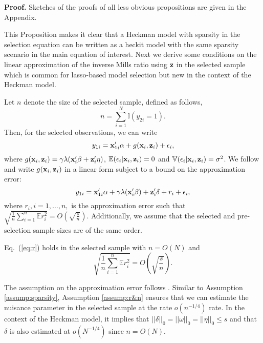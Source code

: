 \documentclass[11pt]{article}
\begin{document}
\textbf{Proof.} Sketches of the proofs of all less obvious propositions are given in the Appendix. 

This Proposition makes it clear that a Heckman model with sparsity in the selection equation can be written as a heckit model with the same sparsity scenario in the main equation of interest. %
Next we derive some conditions on the linear approximation of the inverse Mills ratio using $\mathbf{z}$ in the selected sample which is common for lasso-based model selection but new in the context of the Heckman model.

Let $n$ denote the size of the selected sample, defined as follows, 
\[n = \sum_{i=1}^N\mathbb{I}(y_{2i}=1).\]
Then, for the selected observations, we can write
\[y_{1i} = \mathbf{x}_{1i}'\alpha + g(\mathbf{x}_i, \mathbf{z}_i) + \epsilon_i,\]
where $g(\mathbf{x}_i, \mathbf{z}_i)=\gamma \lambda(\mathbf{x}_i'\beta+ \mathbf{z}_i'\eta)$, $\mathbb{E}(\epsilon_i|\mathbf{x}_i, \mathbf{z}_i) = 0$ and $\mathbb{V}(\epsilon_i|\mathbf{x}_i, \mathbf{z}_i) = \sigma^2$. 
We follow \cite{bellonichernozhukovhansen2014} and write $g(\mathbf{x}_i, \mathbf{z}_i)$ in a linear form subject to a bound on the approximation error:
\begin{equation}\label{eq:r}y_{1i} = \mathbf{x}_{1i}'\alpha + \gamma \lambda(\mathbf{x}_i'\beta) + \mathbf{z}_i'\delta + r_i + \epsilon_i,
\end{equation}
where $r_i, i=1,\ldots, n,$ is the approximation error such that $\sqrt{\frac{1}{n}\sum_{i=1}^n \mathbb{E}r_i^2} = O\left(\sqrt{\frac{s}{n}}\right)$. Additionally, we assume that the selected and pre-selection sample sizes are of the same order.
\begin{assumption} \label{assump:r&n}
Eq.~(\ref{eq:r}) holds in the selected sample with $n=O(N)$ and 
\[\sqrt{\frac{1}{n}\sum_{i=1}^n \mathbb{E}r_i^2} = O\left(\sqrt{\frac{s}{n}}\right).\]
\end{assumption}
The assumption on the approximation error follows \cite{bellonichernozhukovhansen2014}. Similar to Assumption \ref{assump:sparsity}, Assumption \ref{assump:r&n} ensures that we can estimate the nuisance parameter in the selected sample at the rate $o(n^{−1/4})$ rate. In the context of the Heckman model, it implies that $||\delta||_0=||\omega||_0=||\eta||_0 \le s$ and that $\delta$ is also estimated at $o(N^{-1/4})$ since  $n = O(N )$.
\end{document}
